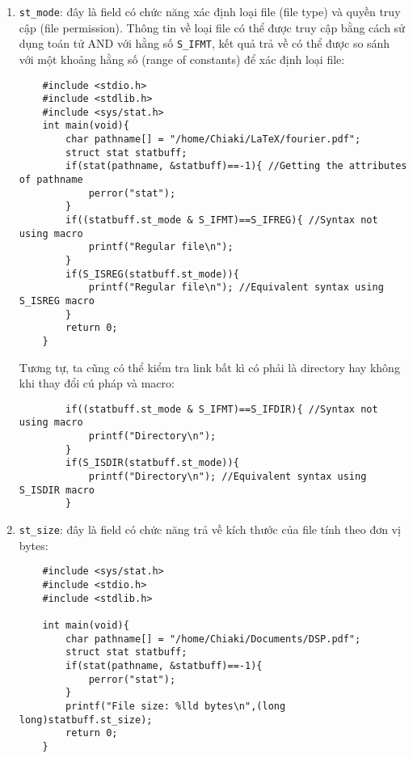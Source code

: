 \documentclass{article}
\begin{document}
\begin{enumerate}
    \item \verb|st_mode|: đây là field có chức năng xác định loại file (file type) và quyền truy cập (file permission). Thông tin về loại file có thể được truy cập bằng cách sử dụng toán tử AND với hằng số \verb|S_IFMT|, kết quả trả về có thể được so sánh với một khoảng hằng số (range of constants) để xác định loại file: 
    \begin{verbatim}
    #include <stdio.h>
    #include <stdlib.h>
    #include <sys/stat.h>
    int main(void){
        char pathname[] = "/home/Chiaki/LaTeX/fourier.pdf";
        struct stat statbuff;
        if(stat(pathname, &statbuff)==-1){ //Getting the attributes of pathname
            perror("stat");
        }
        if((statbuff.st_mode & S_IFMT)==S_IFREG){ //Syntax not using macro
            printf("Regular file\n");
        }
        if(S_ISREG(statbuff.st_mode)){
            printf("Regular file\n"); //Equivalent syntax using S_ISREG macro
        }
        return 0;
    }
    \end{verbatim}
Tương tự, ta cũng có thể kiểm tra link bất kì có phải là directory hay không khi thay đổi cú pháp và macro:
    \begin{verbatim}
        if((statbuff.st_mode & S_IFMT)==S_IFDIR){ //Syntax not using macro
            printf("Directory\n");
        }
        if(S_ISDIR(statbuff.st_mode)){
            printf("Directory\n"); //Equivalent syntax using S_ISDIR macro
        }
    \end{verbatim}
    \item \verb|st_size|: đây là field có chức năng trả về kích thước của file tính theo đơn vị bytes:
    \begin{verbatim}
    #include <sys/stat.h>
    #include <stdio.h>
    #include <stdlib.h>
        
    int main(void){
        char pathname[] = "/home/Chiaki/Documents/DSP.pdf";
        struct stat statbuff;
        if(stat(pathname, &statbuff)==-1){
            perror("stat");
        }
        printf("File size: %lld bytes\n",(long long)statbuff.st_size);
        return 0;
    } 
    \end{verbatim}
\end{enumerate} 
\end{document}
